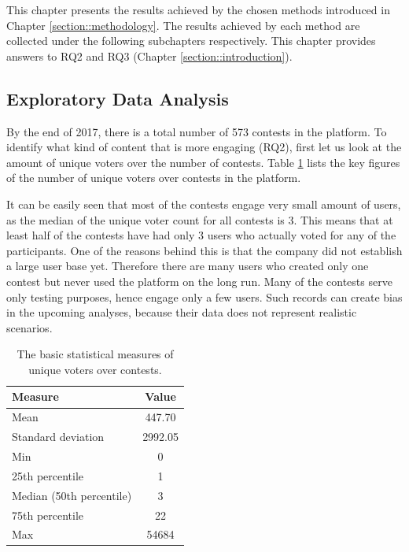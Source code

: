 This chapter presents the results achieved by the chosen methods introduced in Chapter \ref{section::methodology}. The results achieved by each method are collected under the following subchapters respectively. This chapter provides answers to RQ2 and RQ3 (Chapter \ref{section::introduction}).

\subsection{Exploratory Data Analysis}
\label{section::exploratory-data-analysis}
    By the end of 2017, there is a total number of 573 contests in the platform. To identify what kind of content that is more engaging (RQ2), first let us look at the amount of unique voters over the number of contests. Table \ref{user_engagement_in_contests} lists the key figures of the number of unique voters over contests in the platform. 

    It can be easily seen that most of the contests engage very small amount of users, as the median of the unique voter count for all contests is 3. This means that at least half of the contests have had only 3 users who actually voted for any of the participants. One of the reasons behind this is that the company did not establish a large user base yet. Therefore there are many users who created only one contest but never used the platform on the long run. Many of the contests serve only testing purposes, hence engage only a few users. Such records can create bias in the upcoming analyses, because their data does not represent realistic scenarios. 

    \begin{table}[H]
        \centering
        \begin{tabular}{l|c}
            \textbf{Measure} & \textbf{Value} \\
            \hline
            Mean & 447.70 \\
            Standard deviation & 2992.05 \\
            Min & 0 \\
            25th percentile & 1 \\
            Median (50th percentile) & 3 \\
            75th percentile & 22 \\
            Max & 54684
        \end{tabular}
        \caption{The basic statistical measures of unique voters over contests.}
        \label{user_engagement_in_contests}
    \end{table}
    
